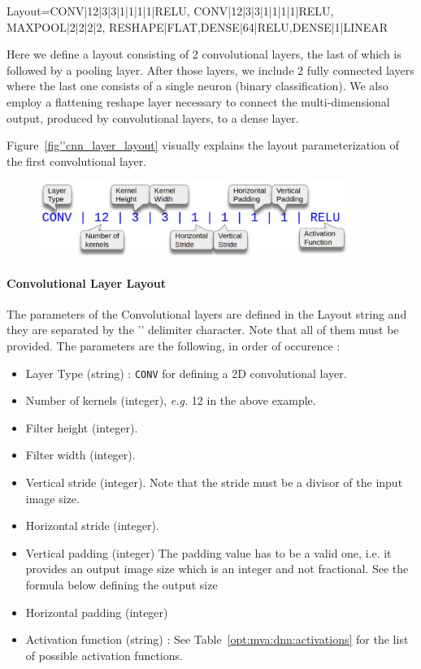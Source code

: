 {\begin{tmvacode}
Layout=CONV|12|3|3|1|1|1|1|RELU, CONV|12|3|3|1|1|1|1|RELU, MAXPOOL|2|2|2|2,
             RESHAPE|FLAT,DENSE|64|RELU,DENSE|1|LINEAR
\end{tmvacode}


Here we define a layout consisting of 2 convolutional layers, the last of which is followed by a pooling layer. After those layers, we include 2 fully connected layers where the last one consists of a
single neuron (binary classification). We also employ a flattening reshape layer necessary to connect the multi-dimensional output, produced by convolutional layers, to a dense layer.



Figure~\ref{fig''cnn_layer_layout}  visually explains the layout parameterization of the first convolutional layer.

\begin{figure}
\begin{center}
   \includegraphics[width=0.9\textwidth]{plots/cnn-layer-layout.pdf}
   \label{fig:cnn_layer_layout}
   \caption{}
\end{center}
\end{figure}


\paragraph{Convolutional Layer Layout}

The parameters of the Convolutional layers are defined in the Layout string and they are separated by the '\code{|}' delimiter character.
Note that all of them must be provided. 
The parameters are the following, in order of occurence : 
\begin{itemize}
\item Layer Type (string) :   {\tt CONV}  for defining a  2D convolutional layer.
\item Number of kernels (integer),  {\it e.g.} 12 in the above example.
\item Filter height  (integer). 
\item Filter width (integer).
\item Vertical stride (integer).  Note that the stride must be a divisor of the input image size.
\item Horizontal stride (integer).  
 \item Vertical padding (integer)  The padding value has to be a valid one, i.e. it provides an output image size which is an  integer and not fractional.  See the formula below defining the output size
 \item  Horizontal padding (integer)
\item Activation function (string) : See Table~\ref{opt:mva:dnn:activations} for the list of possible activation functions.
\end{itemize}

}
